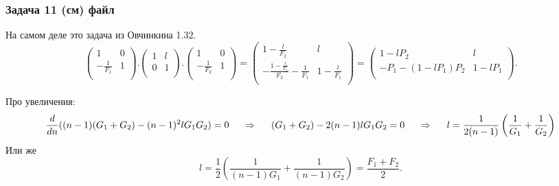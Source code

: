 \subsubsection*{Задача 11 (см) файл}
На самом деле это задача из Овчинкина 1.32.
\begin{equation*}
	\left(
\begin{array}{cc}
 1 & 0 \\
 -\frac{1}{F_1} & 1 \\
\end{array}
\right).\left(
\begin{array}{cc}
 1 & l \\
 0 & 1 \\
\end{array}
\right).\left(
\begin{array}{cc}
 1 & 0 \\
 -\frac{1}{F_2} & 1 \\
\end{array}
\right)
= 
\left(
\begin{array}{cc}
 1-\frac{l}{F_2} & l \\
 -\frac{1-\frac{l}{F_1}}{F_2}-\frac{1}{F_1} & 1-\frac{l}{F_1} \\
\end{array}
\right)
=
\left(
\begin{array}{cc}
 1-l P_2 & l \\
 -P_1-\left(1-l P_1\right) P_2 & 1-l P_1 \\
\end{array}
\right).
\end{equation*}

Про увеличения: 
\begin{equation*}
	\frac{d}{d n}( (n-1)(G_1 + G_2)	- (n-1)^2 l G_1 G_2) = 0
	\hspace{0.5 cm}
	\Rightarrow
	\hspace{0.5 cm}
	(G_1 + G_2)	- 2 (n-1) l G_1 G_2 = 0
	\hspace{0.5 cm}
	\Rightarrow
	\hspace{0.5 cm}
	l = \frac{1}{2 (n-1)} \left(\frac{1}{G_1} + \frac{1}{G_2}\right)
\end{equation*}
Или же
\begin{equation*}
	l = \frac{1}{2}\left(\frac{1}{(n-1)G_1} + \frac{1}{(n-1)G_2}\right) = \frac{F_1 + F_2}{2}.
\end{equation*}